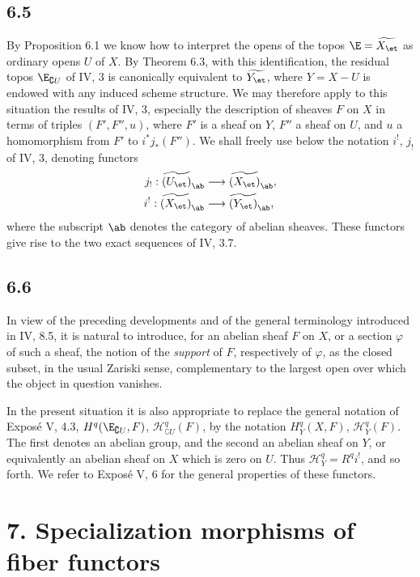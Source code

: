 \subsection*{6.5}
By Proposition 6.1 we know how to interpret the opens of the topos \(\E=\widetilde{X_{\et}}\) as ordinary opens \(U\) of \(X\). By Theorem 6.3, with this identification, the residual topos \(\E_{\complement U}\) of IV, 3 is canonically equivalent to \(\widetilde{Y_{\et}}\), where \(Y=X-U\) is endowed with any induced scheme structure. We may therefore apply to this situation the results of IV, 3, especially the description of sheaves \(F\) on \(X\) in terms of triples \((F',F'',u)\), where \(F'\) is a sheaf on \(Y\), \(F''\) a sheaf on \(U\), and \(u\) a homomorphism from \(F'\) to \(i^*j_*(F'')\). We shall freely use below the notation \(i^!\), \(j_!\) of IV, 3, denoting functors
\[
\begin{aligned}
j_!:\widetilde{(U_{\et})}_{\ab}&\longrightarrow \widetilde{(X_{\et})}_{\ab},\\
i^!:\widetilde{(X_{\et})}_{\ab}&\longrightarrow \widetilde{(Y_{\et})}_{\ab},
\end{aligned}
\]
where the subscript \(\ab\) denotes the category of abelian sheaves. These functors give rise to the two exact sequences of IV, 3.7.

\subsection*{6.6}
In view of the preceding developments and of the general terminology introduced in IV, 8.5, it is natural to introduce, for an abelian sheaf \(F\) on \(X\), or a section \(\varphi\) of such a sheaf, the notion of the \emph{support} of \(F\), respectively of \(\varphi\), as the closed subset, in the usual Zariski sense, complementary to the largest open over which the object in question vanishes.

In the present situation it is also appropriate to replace the general notation of Expos\'e V, 4.3, \(H^q(\E_{\complement U},F)\), \(\mathcal H^q_{\complement U}(F)\), by the notation \(H^q_Y(X,F)\), \(\mathcal H^q_Y(F)\). The first denotes an abelian group, and the second an abelian sheaf on \(Y\), or equivalently an abelian sheaf on \(X\) which is zero on \(U\). Thus \(\mathcal H^q_Y=R^q i^!\), and so forth. We refer to Expos\'e V, 6 for the general properties of these functors.

\section*{7. Specialization morphisms of fiber functors}

